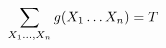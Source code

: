 \documentclass[preview]{standalone}
\begin{document}
\begin{align*}
\special{dvisvgm:raw <g id='unique000'>}\sum_{X_1\ldots,X_n} g(X_1\ldots X_n) = T\special{dvisvgm:raw </g>}
\end{align*}
\end{document}
